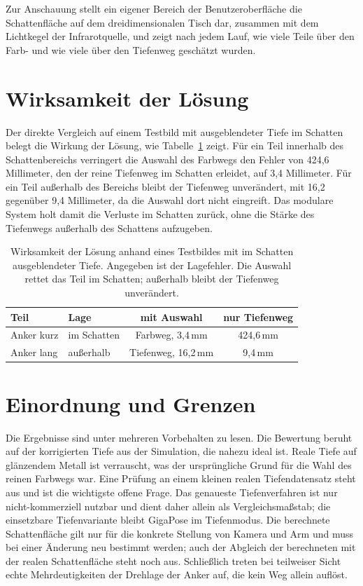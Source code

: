 \documentclass[oneside,studentpaper]{wbk}
\begin{document}
Zur Anschauung stellt ein eigener Bereich der Benutzeroberfläche die
Schattenfläche auf dem dreidimensionalen Tisch dar, zusammen mit dem Lichtkegel
der Infrarotquelle, und zeigt nach jedem Lauf, wie viele Teile über den Farb- und
wie viele über den Tiefenweg geschätzt wurden.

\section{Wirksamkeit der Lösung}
\label{sec:moe-ergebnis}

Der direkte Vergleich auf einem Testbild mit ausgeblendeter Tiefe im Schatten
belegt die Wirkung der Lösung, wie Tabelle~\ref{tab:moe-ab} zeigt. Für ein Teil
innerhalb des Schattenbereichs verringert die Auswahl des Farbwegs den Fehler von
424,6 Millimeter, den der reine Tiefenweg im Schatten erleidet, auf 3,4
Millimeter. Für ein Teil außerhalb des Bereichs bleibt der Tiefenweg unverändert,
mit 16,2 gegenüber 9,4 Millimeter, da die Auswahl dort nicht eingreift. Das
modulare System holt damit die Verluste im Schatten zurück, ohne die Stärke des
Tiefenwegs außerhalb des Schattens aufzugeben.

\begin{table}[H]
\caption{Wirksamkeit der Lösung anhand eines Testbildes mit im Schatten
ausgeblendeter Tiefe. Angegeben ist der Lagefehler. Die Auswahl rettet das Teil im
Schatten; außerhalb bleibt der Tiefenweg unverändert.}
\label{tab:moe-ab}
\centering
\small
\begin{tabular}{l l c c}
\toprule
\textbf{Teil} & \textbf{Lage} & \textbf{mit Auswahl} & \textbf{nur Tiefenweg} \\
\midrule
Anker kurz & im Schatten   & Farbweg, 3,4\,mm   & 424,6\,mm \\
Anker lang & außerhalb     & Tiefenweg, 16,2\,mm & 9,4\,mm \\
\bottomrule
\end{tabular}
\end{table}

\section{Einordnung und Grenzen}

Die Ergebnisse sind unter mehreren Vorbehalten zu lesen. Die Bewertung beruht auf
der korrigierten Tiefe aus der Simulation, die nahezu ideal ist. Reale Tiefe auf
glänzendem Metall ist verrauscht, was der ursprüngliche Grund für die Wahl des
reinen Farbwegs war. Eine Prüfung an einem kleinen realen Tiefendatensatz steht
aus und ist die wichtigste offene Frage. Das genaueste Tiefenverfahren ist nur
nicht-kommerziell nutzbar und dient daher allein als Vergleichsmaßstab; die
einsetzbare Tiefenvariante bleibt GigaPose im Tiefenmodus. Die berechnete
Schattenfläche gilt nur für die konkrete Stellung von Kamera und Arm und muss bei
einer Änderung neu bestimmt werden; auch der Abgleich der berechneten mit der
realen Schattenfläche steht noch aus. Schließlich treten bei teilweiser Sicht
echte Mehrdeutigkeiten der Drehlage der Anker auf, die kein Weg allein auflöst.
\end{document}
